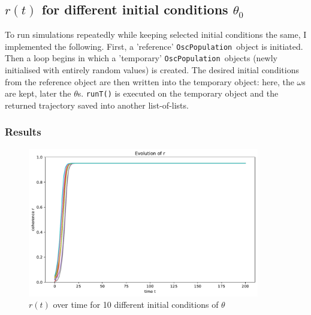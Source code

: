 \documentclass[11pt,a4paper]{article}
\newcommand{\oscpop}{\texttt{OscPopulation}~}
\newcommand{\code}[1]{\texttt{#1}}
\begin{document}
\clearpage
\subsection{$r(t)$ for different initial conditions $\theta_0$}

To run simulations repeatedly while keeping selected initial conditions the same, I implemented the following. 
First, a 'reference' \oscpop object is initiated. 
Then a loop begins in which a 'temporary' \oscpop objects (newly initialised with entirely random values) is created. 
The desired initial conditions from the reference object are then written into the temporary object: here, the $\omega$s are kept, later the $\theta$s. 
\code{runT()} is executed on the temporary object and the returned trajectory saved into another list-of-lists. 








\subsubsection{Results}

\begin{figure}[h]
	\centering
	\includegraphics[width=0.9\textwidth]{graphics/4_t-vs-r_fixedOmegas_omegaDistr=uniform_N=2000_1611570486.pdf}
	\caption{$r(t)$ over time for 10 different initial conditions of $\theta$}
	\label{4}
\end{figure}
\end{document}
